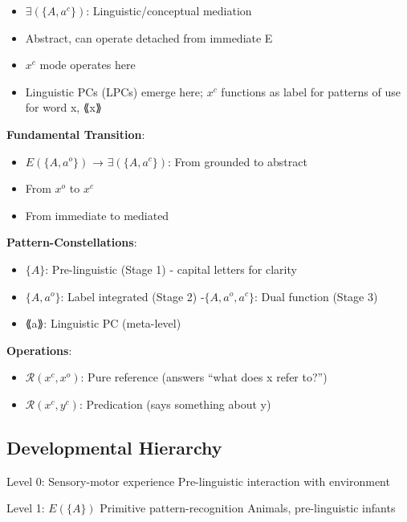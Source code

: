 \documentclass[12pt]{article}
\providecommand{\tightlist}{}   %
\begin{document}
\begin{itemize}
\tightlist
\item
  \(\exists(\{A, a^c\})\): Linguistic/conceptual mediation
\item
  Abstract, can operate detached from immediate E
\item
  \(x^c\) mode operates here
\item
  Linguistic PCs (LPCs) emerge here; \(x^c\) functions as label for patterns of use for word x, ⟪x⟫
\end{itemize}

\textbf{Fundamental Transition}:

\begin{itemize}
\tightlist
\item
  \(E(\{A, a^o\})\) → \(\exists(\{A, a^c\})\): From grounded to abstract
\item
  From \(x^o\) to \(x^c\)
\item
  From immediate to mediated
\end{itemize}

\textbf{Pattern-Constellations}:

\begin{itemize}
\tightlist
\item
  \(\{A\}\): Pre-linguistic (Stage 1) - capital letters for clarity
\item
  \(\{A, a^o\}\): Label integrated (Stage 2) -\(\{A, a^o, a^c \}\): Dual function (Stage 3)
\item
  ⟪a⟫: Linguistic PC (meta-level)
\end{itemize}

\textbf{Operations}:

\begin{itemize}
\tightlist
\item
  \(\mathcal{R}(x^c, x^o)\): Pure reference (answers ``what does x refer to?'')
\item
  \(\mathcal{R}(x^c, y^c)\): Predication (says something about y)
\end{itemize}

\subsection{Developmental Hierarchy}\label{developmental-hierarchy}

Level 0: Sensory-motor experience Pre-linguistic interaction with environment

Level 1: \(E(\{A\})\) Primitive pattern-recognition Animals, pre-linguistic infants
\end{document}
